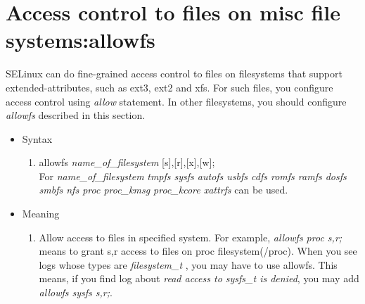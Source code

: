 \documentclass{article}
\begin{document}
\section{Access control to files on misc file systems:allowfs}
 SELinux can do fine-grained access control to files on filesystems that
 support extended-attributes, such as ext3, ext2 and xfs. For such files,
 you configure access control using {\it allow} statement. In other
 filesystems, you should configure {\it allowfs} described in this
 section.

\begin{itemize}
 \item Syntax
       \begin{enumerate}
	\item  allowfs {\it name\_of\_filesystem} [s],[r],[x],[w];\\
	       For {\it name\_of\_filesystem} {\it tmpfs sysfs autofs usbfs cdfs romfs
	       ramfs dosfs smbfs nfs proc proc\_kmsg proc\_kcore xattrfs} can be
	       used.
       \end{enumerate}      
 \item Meaning\\
       \begin{enumerate}

	\item Allow access to files in specified system. For example, {\it
	      allowfs proc s,r;} means to grant s,r access to files on proc
	      filesystem(/proc). When you see logs whose types are {\it
	      filesystem\_t }, you may have to use allowfs. This means, if you
	      find log about {\it read access to sysfs\_t is denied}, you may
	      add {\it allowfs sysfs s,r;}.
		
       \end{enumerate}
       


\end{itemize}
\end{document}
